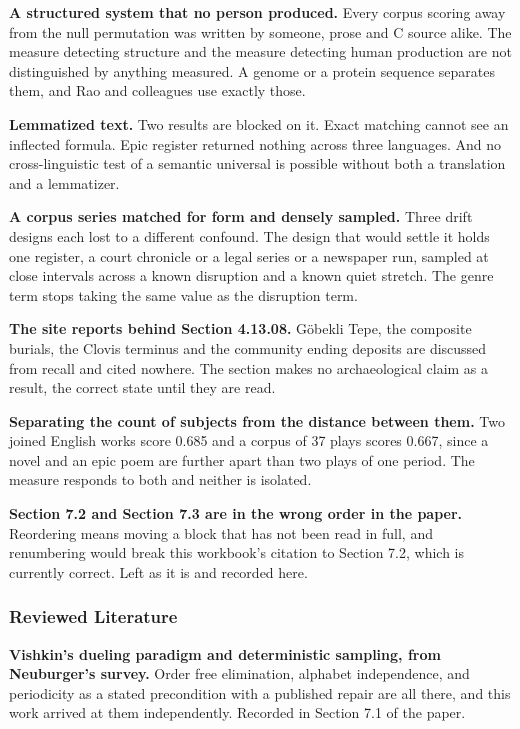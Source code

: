 \textbf{A structured system that no person produced.} Every corpus scoring away from the null permutation was written by someone, prose and C source alike. The measure detecting structure and the measure detecting human production are not distinguished by anything measured. A genome or a protein sequence separates them, and Rao and colleagues use exactly those.

\textbf{Lemmatized text.} Two results are blocked on it. Exact matching cannot see an inflected formula. Epic register returned nothing across three languages. And no cross-linguistic test of a semantic universal is possible without both a translation and a lemmatizer.

\textbf{A corpus series matched for form and densely sampled.} Three drift designs each lost to a different confound. The design that would settle it holds one register, a court chronicle or a legal series or a newspaper run, sampled at close intervals across a known disruption and a known quiet stretch. The genre term stops taking the same value as the disruption term.

\textbf{The site reports behind Section 4.13.08.} Göbekli Tepe, the composite burials, the Clovis terminus and the community ending deposits are discussed from recall and cited nowhere. The section makes no archaeological claim as a result, the correct state until they are read.

\textbf{Separating the count of subjects from the distance between them.} Two joined English works score 0.685 and a corpus of 37 plays scores 0.667, since a novel and an epic poem are further apart than two plays of one period. The measure responds to both and neither is isolated.

\textbf{Section 7.2 and Section 7.3 are in the wrong order in the paper.} Reordering means moving a block that has not been read in full, and renumbering would break this workbook's citation to Section 7.2, which is currently correct. Left as it is and recorded here.

\subsubsection{Reviewed Literature}

\textbf{Vishkin's dueling paradigm and deterministic sampling, from Neuburger's survey.} Order free elimination, alphabet independence, and periodicity as a stated precondition with a published repair are all there, and this work arrived at them independently. Recorded in Section 7.1 of the paper.

